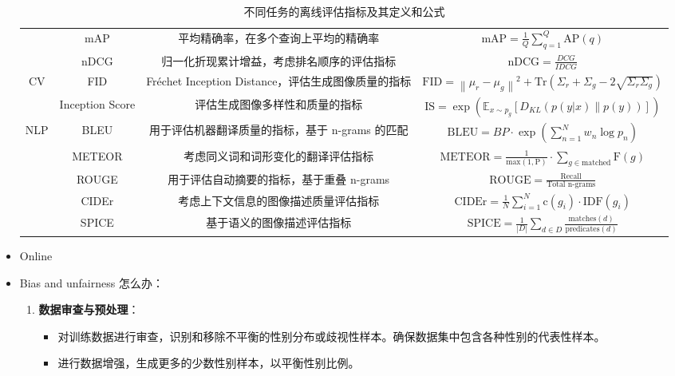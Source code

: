 \documentclass[12pt]{article}
\numberwithin{theorem}{section} %
\numberwithin{definition}{section} %
\numberwithin{assumption}{section} %
\numberwithin{lemma}{section} %
\numberwithin{remark}{section} %
\numberwithin{prop}{section} %
\numberwithin{corollary}{section} %
\numberwithin{example}{section} %
\numberwithin{question}{section} %
\numberwithin{problem}{section} %
\numberwithin{conjecture}{section} %
\numberwithin{append}{section} %
\numberwithin{property}{section} %
\begin{document}
\begin{CJK}{UTF8}{gbsn}
\begin{itemize}
\begin{table}[h]
\begin{tabular}{|c|c|c|c|}
				& mAP & 平均精确率，在多个查询上平均的精确率 & $ \text{mAP} = \frac{1}{Q} \sum_{q=1}^{Q} \text{AP}(q) $ \\
				& nDCG & 归一化折现累计增益，考虑排名顺序的评估指标 & $ \text{nDCG} = \frac{DCG}{IDCG} $ \\
				\midrule
				\multirow{2}{*}{CV} & FID & Fréchet Inception Distance，评估生成图像质量的指标 & $ \text{FID} = \left\| \mu_r - \mu_g \right\|^2 + \text{Tr}(\Sigma_r + \Sigma_g - 2\sqrt{\Sigma_r \Sigma_g}) $ \\
				& Inception Score & 评估生成图像多样性和质量的指标 & $ \text{IS} = \exp\left( \mathbb{E}_{x \sim p_g} [D_{KL}(p(y|x) \| p(y))] \right) $ \\
				\midrule
				\multirow{5}{*}{NLP} & BLEU & 用于评估机器翻译质量的指标，基于 n-grams 的匹配 & $ \text{BLEU} = BP \cdot \exp\left(\sum_{n=1}^{N} w_n \log p_n\right) $ \\
				& METEOR & 考虑同义词和词形变化的翻译评估指标 & $ \text{METEOR} = \frac{1}{\text{max}(1, \text{P})} \cdot \sum_{g \in \text{matched}} \text{F}(g) $ \\
				& ROUGE & 用于评估自动摘要的指标，基于重叠 n-grams & $ \text{ROUGE} = \frac{\text{Recall}}{\text{Total n-grams}} $ \\
				& CIDEr & 考虑上下文信息的图像描述质量评估指标 & $ \text{CIDEr} = \frac{1}{N} \sum_{i=1}^{N} \text{c}(g_i) \cdot \text{IDF}(g_i) $ \\
				& SPICE & 基于语义的图像描述评估指标 & $ \text{SPICE} = \frac{1}{|D|} \sum_{d \in D} \frac{\text{matches}(d)}{\text{predicates}(d)} $ \\
				\bottomrule
			\end{tabular}
			\caption{不同任务的离线评估指标及其定义和公式}
			\label{tab:metrics}
		\end{table}
		
		
		
		\item Online
		\item Bias and unfairness 怎么办：
		\begin{enumerate}
			\item \textbf{数据审查与预处理}：
			\begin{itemize}
				\item 对训练数据进行审查，识别和移除不平衡的性别分布或歧视性样本。确保数据集中包含各种性别的代表性样本。
				\item 进行数据增强，生成更多的少数性别样本，以平衡性别比例。
			\end{itemize}
			

\end{enumerate}
\end{itemize}
\end{CJK}
\end{document}

